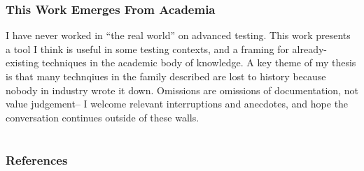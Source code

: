 \documentclass{beamer}
\begin{document}
\begin{frame}
  \frametitle{This Work Emerges From Academia}
  I have never worked in ``the real world'' on advanced testing. This work presents a tool I think is useful in some testing contexts, and a framing for already-existing techniques in the academic body of knowledge. A key theme of my thesis is that many technqiues in the family described are lost to history because nobody in industry wrote it down. Omissions are omissions of documentation, not  value judgement-- I welcome relevant interruptions and anecdotes, and hope the conversation continues outside of these walls.
\end{frame}



\section{} %

\begin{frame}[t, allowframebreaks]
\frametitle{References}


\end{frame}
\end{document}
